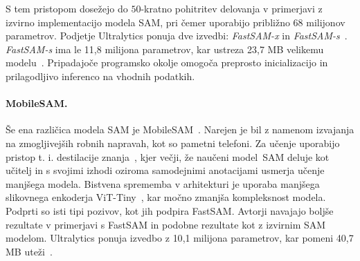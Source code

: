 \documentclass[a4paper,twoside,openright,12pt,slovene]{book}
\begin{document}
            S tem pristopom dosežejo do $50$-kratno pohitritev delovanja v primerjavi z izvirno implementacijo modela SAM, pri čemer uporabijo približno 68 milijonov parametrov. Podjetje Ultralytics ponuja dve izvedbi: \mbox{\emph{FastSAM-x}} in \mbox{\emph{FastSAM-s}}~\cite{src:fastsam_ultralytics}. \emph{FastSAM-s} ima le 11{,}8 milijona parametrov, kar ustreza 23{,}7 MB velikemu modelu~\cite{src:fastsam_ultralytics}. Pripadajoče programsko okolje omogoča preprosto inicializacijo in prilagodljivo inferenco na vhodnih podatkih.
            
            \paragraph{MobileSAM.}
            Še ena različica modela SAM je MobileSAM~\cite{zhang2023faster_mobilesam}. Narejen je bil z namenom izvajanja na zmogljivejših robnih napravah, kot so pametni telefoni. Za učenje uporabijo pristop t. i. destilacije znanja~\cite{src:hinton2015distilling}, kjer večji, že naučeni \mbox{model SAM} deluje kot učitelj in s svojimi izhodi oziroma samodejnimi anotacijami usmerja učenje manjšega modela. Bistvena sprememba v arhitekturi je uporaba manjšega slikovnega enkoderja ViT-Tiny~\cite{src:touvron2021training}, kar močno zmanjša kompleksnost modela. Podprti so isti tipi pozivov, kot jih podpira FastSAM. Avtorji navajajo boljše rezultate v primerjavi s FastSAM in podobne rezultate kot z izvirnim SAM modelom. Ultralytics ponuja izvedbo z 10{,}1 milijona parametrov, kar pomeni 40{,}7 MB uteži~\cite{src:mobilesam_ultralytics}.
    
    
\end{document}
